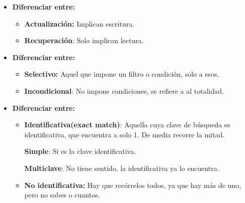 \documentclass[12pt, twoside, openright]{report} %
\begin{document}
\begin{itemize}
\begin{itemize}
        \begin{itemize}
        \item \textbf{Diferenciar entre:}
          

          \begin{itemize}
          \item
            
            \textbf{Actualización:} Implican escritura.
            
          \item
            
            \textbf{Recuperación}: Solo implican lectura.
            
          \end{itemize}
        \item \textbf{Diferenciar entre:}
          

          \begin{itemize}
          \item
            
            \textbf{Selectivo:} Aquel que impone un filtro o condición,
            solo a esos.
            
          \item
            
            \textbf{Incondicional}: No impone condiciones, se refiere a
            al totalidad.
            
          \end{itemize}
        \item \textbf{Diferenciar entre:}
          

          \begin{itemize}
          \item
            
            \textbf{Identificativa(exact match)}: Aquella cuya clave de
            búsqueda es identificativa, que encuentra a solo 1. De media
            recorre la mitad.
            

            
			
              \textbf{Simple}: Si es la clave identificativa.
              
			  
              \textbf{Multiclave}: No tiene sentido, la identificativa
              ya lo encuentra.
             
          \item
            
            \textbf{No identificativa:} Hay que recórrelos todos, ya que
            hay más de uno, pero no sabes o cuantos.
            

\end{itemize}
\end{itemize}
\end{itemize}
\end{itemize}
\end{document}

